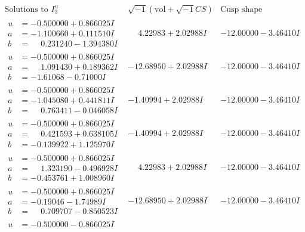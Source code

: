 \documentclass[1p]{elsarticle_modified}
\theoremstyle{definition}
\newcommand{\I}{\sqrt{-1}}
\begin{document}
$$\begin{array}{c|c|c}  
\text{Solutions to }I^u_{3}& \I (\text{vol} + \sqrt{-1}CS) & \text{Cusp shape}\\
 \hline 
\begin{aligned}
u &= -0.500000 + 0.866025 I \\
a &= -1.100660 + 0.111510 I \\
b &= \phantom{-}0.231240 - 1.394380 I\end{aligned}
 & \phantom{-}4.22983 + 2.02988 I & -12.00000 - 3.46410 I \\ \hline\begin{aligned}
u &= -0.500000 + 0.866025 I \\
a &= \phantom{-}1.091430 + 0.189362 I \\
b &= -1.61068 - 0.71000 I\end{aligned}
 & -12.68950 + 2.02988 I & -12.00000 - 3.46410 I \\ \hline\begin{aligned}
u &= -0.500000 + 0.866025 I \\
a &= -1.045080 + 0.441811 I \\
b &= \phantom{-}0.763411 - 0.046058 I\end{aligned}
 & -1.40994 + 2.02988 I & -12.00000 - 3.46410 I \\ \hline\begin{aligned}
u &= -0.500000 + 0.866025 I \\
a &= \phantom{-}0.421593 + 0.638105 I \\
b &= -0.139922 + 1.125970 I\end{aligned}
 & -1.40994 + 2.02988 I & -12.00000 - 3.46410 I \\ \hline\begin{aligned}
u &= -0.500000 + 0.866025 I \\
a &= \phantom{-}1.323190 - 0.496928 I \\
b &= -0.453761 + 1.008960 I\end{aligned}
 & \phantom{-}4.22983 + 2.02988 I & -12.00000 - 3.46410 I \\ \hline\begin{aligned}
u &= -0.500000 + 0.866025 I \\
a &= -0.19046 - 1.74989 I \\
b &= \phantom{-}0.709707 - 0.850523 I\end{aligned}
 & -12.68950 + 2.02988 I & -12.00000 - 3.46410 I \\ \hline\begin{aligned}
u &= -0.500000 - 0.866025 I \\

\end{aligned}
\end{array}$$
\end{document}
